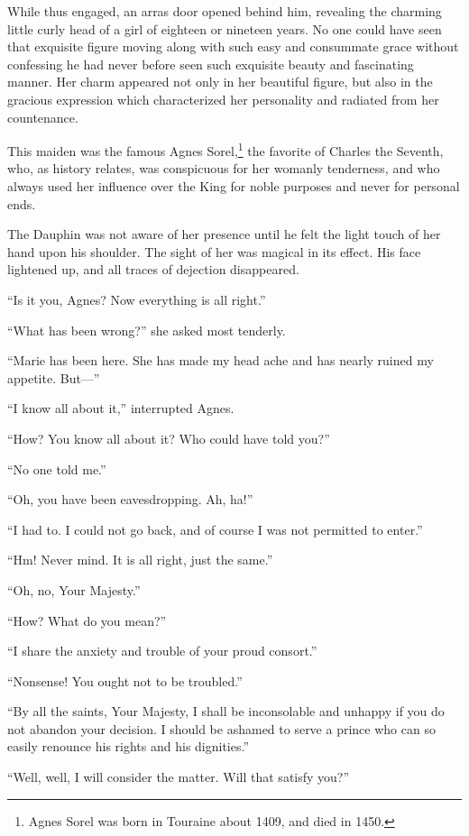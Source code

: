 While thus engaged, an arras door opened behind him, revealing the
charming little curly head of a girl of eighteen or nineteen years. No
one could have seen that exquisite figure moving along with such easy
and consummate grace without confessing he had never before seen such
exquisite beauty and fascinating manner. Her charm appeared not only in
her beautiful figure, but also in the gracious expression which
characterized her personality and radiated from her countenance.

This maiden was the famous Agnes Sorel,\footnote{Agnes Sorel was born in
  Touraine about 1409, and died in 1450.} the favorite of Charles the
Seventh, who, as history relates, was conspicuous for her womanly
tenderness, and who always used her influence over the King for noble
purposes and never for personal ends.

The Dauphin was not aware of her presence until he felt the light touch
of her hand upon his shoulder. The sight of her was magical in its
effect. His face lightened up, and all traces of dejection disappeared.

``Is it you, Agnes? Now everything is all right.''

``What has been wrong?'' she asked most tenderly.

``Marie has been here. She has made my head ache and has nearly ruined
my appetite. But---''

``I know all about it,'' interrupted Agnes.

``How? You know all about it? Who could have told you?''

``No one told me.''

``Oh, you have been eavesdropping. Ah, ha!''

``I had to. I could not go back, and of course I was not permitted to
enter.''

``Hm! Never mind. It is all right, just the same.''

``Oh, no, Your Majesty.''

``How? What do you mean?''

``I share the anxiety and trouble of your proud consort.''

``Nonsense! You ought not to be troubled.''

``By all the saints, Your Majesty, I shall be inconsolable and unhappy
if you do not abandon your decision. I should be ashamed to serve a
prince who can so easily renounce his rights and his dignities.''

``Well, well, I will consider the matter. Will that satisfy you?''

